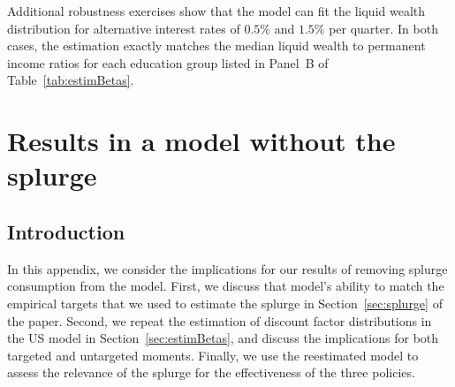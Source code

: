 \documentclass[\latexroot/\projectname]{subfiles}
\begin{document}

\whenstandalone{%
  \setcounter{section}{1}  %
}

Additional robustness exercises show that the model can fit the liquid wealth distribution for alternative interest rates of $0.5\%$ and $1.5\%$ per quarter. In both cases, the estimation exactly matches the median liquid wealth to permanent income ratios for each education group listed in Panel~B of Table~\ref{tab:estimBetas}.
\section{Results in a model without the splurge}
\whenintegrated{\label{app:Model-without-splurge}} %

\subsection{Introduction}
\whenintegrated{\label{app:Model-without-splurge-intro}} %

In this appendix, we consider the implications for our results of removing splurge consumption from the model. First, we discuss that model's ability to match the empirical targets that we used to estimate the splurge in Section~\ref{sec:splurge} of the paper. Second, we repeat the estimation of discount factor distributions in the US model in Section~\ref{sec:estimBetas}, and discuss the implications for both targeted and untargeted moments. Finally, we use the reestimated model to assess the relevance of the splurge for the effectiveness of the three policies.
\end{document}
